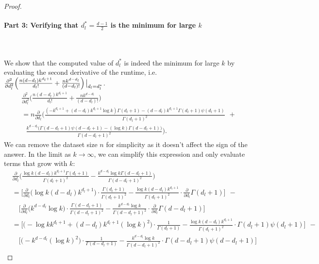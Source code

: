 \begin{proof}
\paragraph{Part 3: Verifying that $d_l^* = \frac{d-1}{2}$ is the minimum for large $k$}\leavevmode\leavevmode\\\\
We show that the computed value of $d_l^*$ is indeed the minimum for large $k$ by evaluating the second derivative of the runtime, i.e. $\frac{\partial^2}{\partial d_l^2}\Big(\frac{n(d-d_l)k^{d_l+1}}{d_l!} + \frac{nk^{d - d_l}}{(d-d_l)!}\Big)\eval_{d_l = d_l^*}$. 
\begin{align}
    &\frac{\partial^2}{\partial d_l^2}\Big(\frac{n(d-d_l)k^{d_l+1}}{d_l!} + \frac{nk^{d - d_l}}{(d-d_l)!}\Big) \\
    &= n\frac{\partial}{\partial d_l}\Big(\frac{(-k^{d_l+1}+(d-d_l)k^{d_l+1}\log k)\Gamma(d_l+1) - (d-d_l)k^{d_l+1}\Gamma(d_l+1)\psi(d_l+1)}{\Gamma(d_l+1)^2} \ \ +\\& \ \ \ \frac{k^{d-d_l}\big(\Gamma(d-d_l+1)\psi(d-d_l+1)-(\log k)\Gamma(d-d_l+1)\big)}{\Gamma(d-d_l+1)^2}\Big).
\end{align}
We can remove the dataset size $n$ for simplicity as it doesn't affect the sign of the answer. In the limit as $k \rightarrow \infty$, we can simplify this expression and only evaluate terms that grow with $k$: 
\begin{align}
    &\frac{\partial}{\partial d_l} \Bigg(\frac{\log k (d-d_l) k^{d_l+1} \Gamma(d_l+1)}{\Gamma(d_l+1)^2} - \frac{k^{d-d_l} \log k \Gamma(d-d_l+1)}{\Gamma(d-d_l+1)^2}\Bigg)\\
    &= \Bigg[\frac{\partial}{\partial d_l} \Big(\log k (d-d_l) k^{d_l+1}\Big) \cdot \frac{\Gamma(d_l+1)}{\Gamma(d_l+1)^2} - \frac{\log k (d-d_l) k^{d_l+1}}{\Gamma(d_l+1)^2} \cdot \frac{\partial}{\partial d_l} \Gamma(d_l+1)\Bigg] \ \ - \\
    &\quad \Bigg[\frac{\partial}{\partial d_l} \Big(k^{d-d_l} \log k\Big) \cdot \frac{\Gamma(d-d_l+1)}{\Gamma(d-d_l+1)^2} - \frac{k^{d-d_l} \log k}{\Gamma(d-d_l+1)^2} \cdot \frac{\partial}{\partial d_l} \Gamma(d-d_l+1)\Bigg]\\
    &= \Bigg[\Big(-\log k k^{d_l+1} + (d-d_l)k^{d_l+1} (\log k)^2 \Big) \cdot \frac{1}{\Gamma(d_l+1)} - \frac{\log k (d-d_l) k^{d_l+1}}{\Gamma(d_l+1)^2} \cdot \Gamma(d_l+1)\psi(d_l+1)\Bigg] \ \ - \\
    &\quad \Bigg[\Big(-k^{d-d_l} (\log k)^2\Big) \cdot \frac{1}{\Gamma(d-d_l+1)} - \frac{k^{d-d_l} \log k}{\Gamma(d-d_l+1)^2} \cdot \Gamma(d-d_l+1)\psi(d-d_l+1)\Bigg]\\

\end{align}
\end{proof}
